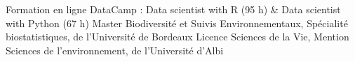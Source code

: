 %
%
%


\begin{scholarship}

					{Formation en ligne DataCamp : Data scientist with R (95 h) \& Data scientist with Python (67 h)}
					{Master Biodiversité et Suivis Environnementaux, Spécialité biostatistiques, de l'Université de Bordeaux}
					{Licence Sciences de la Vie, Mention Sciences de l'environnement, de l'Université d'Albi}
\end{scholarship}